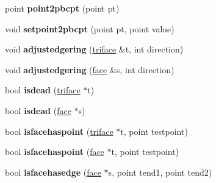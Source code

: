 \begin{DoxyCompactItemize}
\item 
\hypertarget{classtetgenmesh_a6e0b89daa65351106e652aa605e19bfb}{point {\bfseries point2pbcpt} (point pt)}\label{classtetgenmesh_a6e0b89daa65351106e652aa605e19bfb}

\item 
\hypertarget{classtetgenmesh_aa59cc50dd412d717283f57815d5bc39d}{void {\bfseries setpoint2pbcpt} (point pt, point value)}\label{classtetgenmesh_aa59cc50dd412d717283f57815d5bc39d}

\item 
\hypertarget{classtetgenmesh_a7386fc368066faedb98f3ea5bc954965}{void {\bfseries adjustedgering} (\hyperlink{classtetgenmesh_1_1triface}{triface} \&t, int direction)}\label{classtetgenmesh_a7386fc368066faedb98f3ea5bc954965}

\item 
\hypertarget{classtetgenmesh_a6993a7edeade130288b2dfd3603c5f34}{void {\bfseries adjustedgering} (\hyperlink{classtetgenmesh_1_1face}{face} \&s, int direction)}\label{classtetgenmesh_a6993a7edeade130288b2dfd3603c5f34}

\item 
\hypertarget{classtetgenmesh_ac96635f2b4a969554240ccd72b4f1e1e}{bool {\bfseries isdead} (\hyperlink{classtetgenmesh_1_1triface}{triface} $\ast$t)}\label{classtetgenmesh_ac96635f2b4a969554240ccd72b4f1e1e}

\item 
\hypertarget{classtetgenmesh_a59de0719f4a3228bf6858c1ad5bfb16f}{bool {\bfseries isdead} (\hyperlink{classtetgenmesh_1_1face}{face} $\ast$s)}\label{classtetgenmesh_a59de0719f4a3228bf6858c1ad5bfb16f}

\item 
\hypertarget{classtetgenmesh_a4eefdb1d8550ca521dd344fd32d64c4c}{bool {\bfseries isfacehaspoint} (\hyperlink{classtetgenmesh_1_1triface}{triface} $\ast$t, point testpoint)}\label{classtetgenmesh_a4eefdb1d8550ca521dd344fd32d64c4c}

\item 
\hypertarget{classtetgenmesh_a5611db2ae7985992c0cac68bdc9e5c86}{bool {\bfseries isfacehaspoint} (\hyperlink{classtetgenmesh_1_1face}{face} $\ast$t, point testpoint)}\label{classtetgenmesh_a5611db2ae7985992c0cac68bdc9e5c86}

\item 
\hypertarget{classtetgenmesh_a75374a29ebe7acbb6e123015eb6e05de}{bool {\bfseries isfacehasedge} (\hyperlink{classtetgenmesh_1_1face}{face} $\ast$s, point tend1, point tend2)}\label{classtetgenmesh_a75374a29ebe7acbb6e123015eb6e05de}


\end{DoxyCompactItemize}
